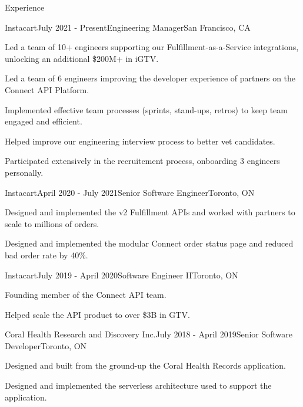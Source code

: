 \documentclass{resume} %
\begin{document}
\begin{rSection}{Experience}

\begin{rSubsection}{Instacart}{July 2021 - Present}{Engineering Manager}{San Francisco, CA}
\item Led a team of 10+ engineers supporting our Fulfillment-as-a-Service integrations, unlocking an additional \$200M+ in iGTV.
\item Led a team of 6 engineers improving the developer experience of partners on the Connect API Platform.
\item Implemented effective team processes (sprints, stand-ups, retros) to keep team engaged and efficient.
\item Helped improve our engineering interview process to better vet candidates.
\item Participated extensively in the recruitement process, onboarding 3 engineers personally.
\end{rSubsection}


\begin{rSubsection}{Instacart}{April 2020 - July 2021}{Senior Software Engineer}{Toronto, ON}
\item Designed and implemented the v2 Fulfillment APIs and worked with partners to scale to millions of orders.
\item Designed and implemented the modular Connect order status page and reduced bad order rate by 40\%.
\end{rSubsection}


\begin{rSubsection}{Instacart}{July 2019 - April 2020}{Software Engineer II}{Toronto, ON}
\item Founding member of the Connect API team.
\item Helped scale the API product to over \$3B in GTV.
\end{rSubsection}


\begin{rSubsection}{Coral Health Research and Discovery Inc.}{July 2018 - April 2019}{Senior Software Developer}{Toronto, ON}
\item Designed and built from the ground-up the Coral Health Records application.
\item Designed and implemented the serverless architecture used to support the application.
\end{rSubsection}


\end{rSection}
\end{document}
